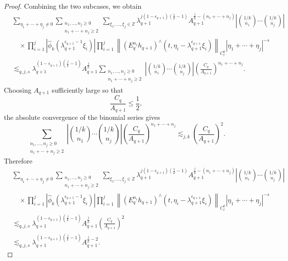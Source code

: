 \documentclass[12pt,reqno,letterpaper]{amsart}
\numberwithin{equation}{section}
\newcommand{\1}{{\bf 1}}
\newcommand{\2}{{\bf 2}}
\theoremstyle{remark}
\theoremstyle{remark}
\begin{document}
\begin{proof}
Combining the two subcases, we obtain
\[
\begin{aligned}
&\sum_{\eta_1+\cdots+\eta_j\neq0}
\sum_{\substack{n_1,\ldots,n_j\geq0\\ n_1+\cdots+n_j\geq2}}
\sum_{\xi_1,\ldots,\xi_j\in\mathbb Z}
\lambda_{q+1}^{j(1-\epsilon_{q+1})(\frac1k-1)}
A_{q+1}^{\frac jk-(n_1+\cdots+n_j)}
\left|\binom{1/k}{n_1}\cdots\binom{1/k}{n_j}\right|
\\
&\quad\times
\prod_{i=1}^j
\left|
\hat{\phi}_k
\left(\lambda_{q+1}^{\epsilon_{q+1}-1}\xi_i\right)
\right|
\prod_{i=1}^j
\left\|
\left(E_q^{n_i}h_{q+1}\right)^\wedge
\left(t,\eta_i-\lambda_{q+1}^{\epsilon_{q+1}}\xi_i\right)
\right\|_{C_t^0}
|\eta_1+\cdots+\eta_j|^{-s}
\\
&\lesssim_{q,j,s}
\lambda_{q+1}^{(1-\epsilon_{q+1})(\frac jk-1)}
A_{q+1}^{\frac jk}
\sum_{\substack{n_1,\ldots,n_j\geq0\\ n_1+\cdots+n_j\geq2}}
\left|\binom{1/k}{n_1}\cdots\binom{1/k}{n_j}\right|
\left(\frac{C_q}{A_{q+1}}\right)^{n_1+\cdots+n_j}.
\end{aligned}
\]
Choosing $A_{q+1}$ sufficiently large so that
\begin{equation}\label{eq:A_q+1_cond}
    \frac{C_q}{A_{q+1}}\leq \frac{1}{2},
\end{equation}
the absolute convergence of the binomial series gives
\[
\sum_{\substack{n_1,\ldots,n_j\geq0\\ n_1+\cdots+n_j\geq2}}
\left|\binom{1/k}{n_1}\cdots\binom{1/k}{n_j}\right|
\left(\frac{C_q}{A_{q+1}}\right)^{n_1+\cdots+n_j}
\lesssim_{j,k}
\left(\frac{C_q}{A_{q+1}}\right)^2.
\]
Therefore
\[
\begin{aligned}
&\sum_{\eta_1+\cdots+\eta_j\neq0}
\sum_{\substack{n_1,\ldots,n_j\geq0\\ n_1+\cdots+n_j\geq2}}
\sum_{\xi_1,\ldots,\xi_j\in\mathbb Z}
\lambda_{q+1}^{j(1-\epsilon_{q+1})(\frac1k-1)}
A_{q+1}^{\frac jk-(n_1+\cdots+n_j)}
\left|\binom{1/k}{n_1}\cdots\binom{1/k}{n_j}\right|
\\
&\quad\times
\prod_{i=1}^j
\left|
\hat{\phi}_k
\left(\lambda_{q+1}^{\epsilon_{q+1}-1}\xi_i\right)
\right|
\prod_{i=1}^j
\left\|
\left(E_q^{n_i}h_{q+1}\right)^\wedge
\left(t,\eta_i-\lambda_{q+1}^{\epsilon_{q+1}}\xi_i\right)
\right\|_{C_t^0}
|\eta_1+\cdots+\eta_j|^{-s}
\\
&\lesssim_{q,j,s}
\lambda_{q+1}^{(1-\epsilon_{q+1})(\frac jk-1)}
A_{q+1}^{\frac jk}
\left(\frac{C_q}{A_{q+1}}\right)^2
\\
&\lesssim_{q,j,s}
\lambda_{q+1}^{(1-\epsilon_{q+1})(\frac jk-1)}
A_{q+1}^{\frac jk-2}.

\end{aligned}\]
\end{proof}
\end{document}

